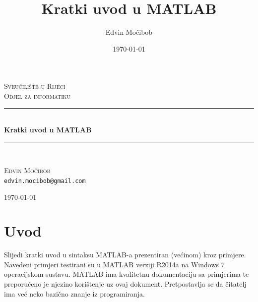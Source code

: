 \documentclass[a4paper, 10pt]{article}
\title{Kratki uvod u MATLAB}
\author{Edvin Močibob}
\date{\today}
\begin{document}

\begin{titlepage}
\newcommand{\HRule}{\rule{\linewidth}{0.5mm}}
\begin{center}

\textsc{\LARGE Sveučilište u Rijeci}\\[0.5cm]
\textsc{\Large Odjel za informatiku}\\[2.5cm]

\HRule \\[0.4cm]
{\huge \bfseries Kratki uvod u MATLAB}\\[0.1cm]

\HRule \\[1.5cm]

\begin{minipage}{0.5\textwidth}
	\begin{center}
		\large
		\textsc{\Large Edvin Močibob}\\[0.1cm]
		\texttt{edvin.mocibob@gmail.com} %
	\end{center}
\end{minipage}

\vfill
{\large \today}
\end{center}
\end{titlepage}


\tableofcontents
\clearpage


\section*{Uvod}

Slijedi kratki uvod u sintaksu MATLAB-a prezentiran (većinom) kroz primjere. Navedeni primjeri testirani su u MATLAB verziji R2014a na Windows 7 operacijskom sustavu. MATLAB ima kvalitetnu dokumentaciju sa primjerima te preporučeno je njezino korištenje uz ovaj dokument. Pretpostavlja se da čitatelj ima već neko bazično znanje iz programiranja.
\end{document}
